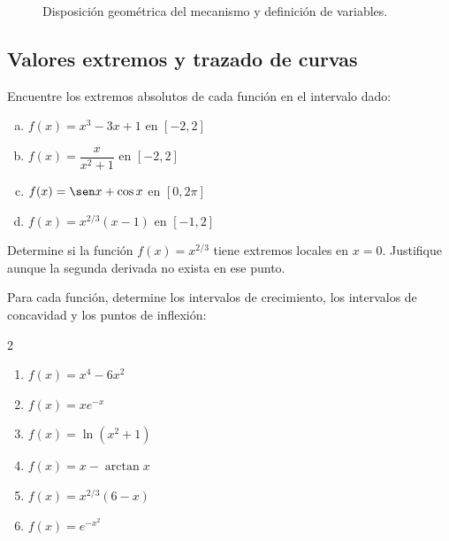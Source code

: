 \begin{prob}
\begin{figure}[!htbp]
    \caption{Disposición geométrica del mecanismo y definición de variables.}
    \label{fig:mecanismo}
  \end{figure}
\end{prob}


\subsection{Valores extremos y trazado de curvas}

\begin{prob}
Encuentre los extremos absolutos de cada función en el intervalo dado:
\begin{enumerate}[a)]
    \item $f(x)=x^3-3x+1$ en $[-2,2]$
    \item $f(x)=\dfrac{x}{x^2+1}$ en $[-2,2]$
    \item $f(x)=\sen x + \cos x$ en $[0,2\pi]$
    \item $f(x)=x^{2/3}(x-1)$ en $[-1,2]$
\end{enumerate}
\end{prob}

\begin{prob}
Determine si la función $f(x)=x^{2/3}$ tiene extremos locales en
$x=0$. Justifique aunque la segunda derivada no exista en ese punto.
\end{prob}

\begin{prob}
Para cada función, determine los intervalos de crecimiento, los
intervalos de concavidad y los puntos de inflexión:
\begin{multicols}{2}
\begin{enumerate}
    \item $f(x)=x^4-6x^2$
    \item $f(x)=xe^{-x}$
    \item $f(x)=\ln(x^2+1)$
    \item $f(x)=x-\arctan x$
    \item $f(x)=x^{2/3}(6-x)$
    \item $f(x)=e^{-x^2}$
\end{enumerate}
\end{multicols}
\end{prob}

